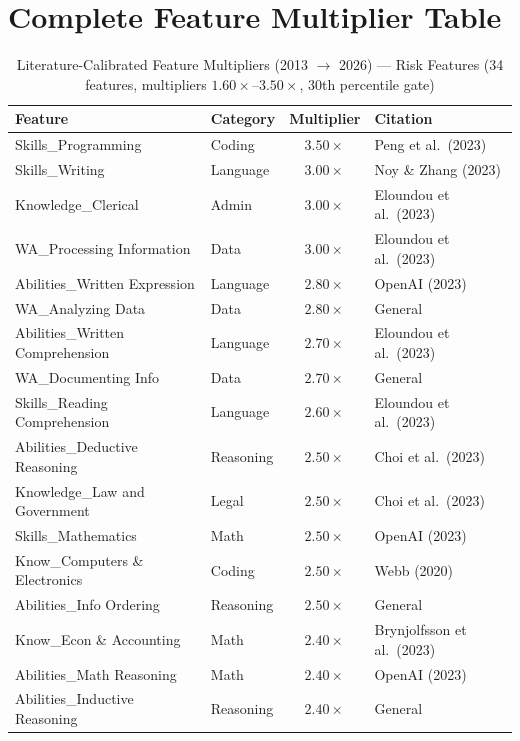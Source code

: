 \chapter{Complete Feature Multiplier Table}
\label{chap:appendix_a}

\begin{table}[htbp]
\centering
\caption{Literature-Calibrated Feature Multipliers (2013 $\to$ 2026) --- Risk Features (34 features, multipliers $1.60\times$--$3.50\times$, 30th percentile gate)}
\label{tab:risk_multipliers}
\small
\begin{tabular}{llcl}
\toprule
\textbf{Feature} & \textbf{Category} & \textbf{Multiplier} & \textbf{Citation} \\
\midrule
Skills\_Programming & Coding & $3.50\times$ & Peng et al.\ (2023) \\
Skills\_Writing & Language & $3.00\times$ & Noy \& Zhang (2023) \\
Knowledge\_Clerical & Admin & $3.00\times$ & Eloundou et al.\ (2023) \\
WA\_Processing Information & Data & $3.00\times$ & Eloundou et al.\ (2023) \\
Abilities\_Written Expression & Language & $2.80\times$ & OpenAI (2023) \\
WA\_Analyzing Data & Data & $2.80\times$ & General \\
Abilities\_Written Comprehension & Language & $2.70\times$ & Eloundou et al.\ (2023) \\
WA\_Documenting Info & Data & $2.70\times$ & General \\
Skills\_Reading Comprehension & Language & $2.60\times$ & Eloundou et al.\ (2023) \\
Abilities\_Deductive Reasoning & Reasoning & $2.50\times$ & Choi et al.\ (2023) \\
Knowledge\_Law and Government & Legal & $2.50\times$ & Choi et al.\ (2023) \\
Skills\_Mathematics & Math & $2.50\times$ & OpenAI (2023) \\
Know\_Computers \& Electronics & Coding & $2.50\times$ & Webb (2020) \\
Abilities\_Info Ordering & Reasoning & $2.50\times$ & General \\
Know\_Econ \& Accounting & Math & $2.40\times$ & Brynjolfsson et al.\ (2023) \\
Abilities\_Math Reasoning & Math & $2.40\times$ & OpenAI (2023) \\
Abilities\_Inductive Reasoning & Reasoning & $2.40\times$ & General \\

\end{tabular}
\end{table}

